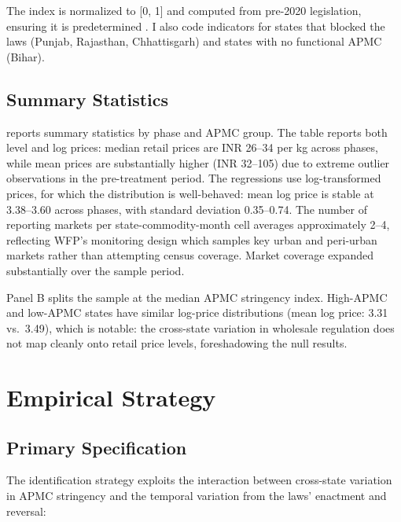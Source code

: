 \documentclass[12pt]{article}
\begin{document}
The index is normalized to [0, 1] and computed from pre-2020 legislation, ensuring it is predetermined \citep{acharya2006marketing, chand2015agricultural, chatterjee2020apmc}. I also code indicators for states that blocked the laws (Punjab, Rajasthan, Chhattisgarh) and states with no functional APMC (Bihar).

\subsection{Summary Statistics}

 reports summary statistics by phase and APMC group. The table reports both level and log prices: median retail prices are INR 26--34 per kg across phases, while mean prices are substantially higher (INR 32--105) due to extreme outlier observations in the pre-treatment period. The regressions use log-transformed prices, for which the distribution is well-behaved: mean log price is stable at 3.38--3.60 across phases, with standard deviation 0.35--0.74. The number of reporting markets per state-commodity-month cell averages approximately 2--4, reflecting WFP's monitoring design which samples key urban and peri-urban markets rather than attempting census coverage. Market coverage expanded substantially over the sample period.

Panel B splits the sample at the median APMC stringency index. High-APMC and low-APMC states have similar log-price distributions (mean log price: 3.31 vs.\ 3.49), which is notable: the cross-state variation in wholesale regulation does not map cleanly onto retail price levels, foreshadowing the null results.

\begin{table}[H]
\centering
\caption{Summary Statistics}
\label{tab:summary}

\end{table}


\section{Empirical Strategy}

\subsection{Primary Specification}

The identification strategy exploits the interaction between cross-state variation in APMC stringency and the temporal variation from the laws' enactment and reversal:
\end{document}
